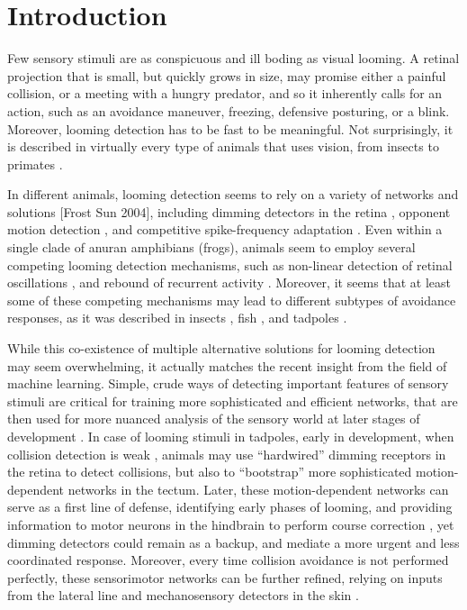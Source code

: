 \documentclass{article}
\begin{document}
\section*{Introduction}

Few sensory stimuli are as conspicuous and ill boding as visual looming. A retinal projection that is small, but quickly grows in size, may promise either a painful collision, or a meeting with a hungry predator, and so it inherently calls for an action, such as an avoidance maneuver, freezing, defensive posturing, or a blink. Moreover, looming detection has to be fast to be meaningful. Not surprisingly, it is described in virtually every type of animals that uses vision, from insects to primates \citep{Pereira2016}.

In different animals, looming detection seems to rely on a variety of networks and solutions [Frost Sun 2004], including dimming detectors in the retina \citep{ishikane2005,munch2009}, opponent motion detection \citep{klapoetke2017looming}, and competitive spike-frequency adaptation \citep{peron2009adaptation,fotowat2011multiplexing}. Even within a single clade of anuran amphibians (frogs), animals seem to employ several competing looming detection mechanisms, such as non-linear detection of retinal oscillations \citep{baranauskas2012}, and rebound of recurrent activity \citep{jang2016}. Moreover, it seems that at least some of these competing mechanisms may lead to different subtypes of avoidance responses, as it was described in insects \citep{card2008tradeoffs,chan2013avoidance}, fish \citep{burgess2007twoescapes,portugues2009behaviors,budick2000repertoire,temizer2015pathway,bhattacharyya2017assessment}, and tadpoles \citep{khakhalin2014}.

While this co-existence of multiple alternative solutions for looming detection may seem overwhelming, it actually matches the recent insight from the field of machine learning. Simple, crude ways of detecting important features of sensory stimuli are critical for training more sophisticated and efficient networks, that are then used for more nuanced analysis of the sensory world at later stages of development \citep{marblestone2016deeplearning}. In case of looming stimuli in tadpoles, early in development, when collision detection is weak \citep{dong2009}, animals may use “hardwired” dimming receptors in the retina to detect collisions, but also to “bootstrap” more sophisticated motion-dependent networks in the tectum. Later, these motion-dependent networks can serve as a first line of defense, identifying early phases of looming, and providing information to motor neurons in the hindbrain to perform course correction \citep{khakhalin2014,bhattacharyya2017assessment}, yet dimming detectors could remain as a backup, and mediate a more urgent and less coordinated response. Moreover, every time collision avoidance is not performed perfectly, these sensorimotor networks can be further refined, relying on inputs from the lateral line and mechanosensory detectors in the skin \citep{felch2016}.
\end{document}
